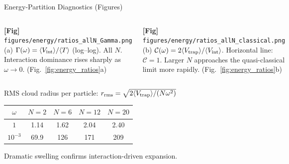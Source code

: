 \documentclass[aspectratio=169,10pt]{beamer}
\newcommand{\figphc}[2]{%
  \colorbox{gray!10}{\parbox{0.44\linewidth}{%
    \centering\smallskip
    \textbf{\color{gray!70}[Fig]}\\[2pt]%
    {\tiny\color{gray!60}\nolinkurl{#1}}\\[2pt]%
    {\scriptsize\color{gray!60}#2}\smallskip}}}
\begin{document}
\begin{frame}{Energy-Partition Diagnostics (Figures)}
  \begin{columns}[T]
      \centering
      \figphc{figures/energy/ratios_allN_Gamma.png}{%
        (a) $\Gamma(\omega)=\langle V_{\rm int}\rangle/\langle T\rangle$
        (log--log). All $N$. Interaction dominance rises sharply as
        $\omega\to 0$. (Fig.~\ref{fig:energy_ratios}a)}
      \centering
      \figphc{figures/energy/ratios_allN_classical.png}{%
        (b) $\mathcal{C}(\omega)=2\langle V_{\rm trap}\rangle/
        \langle V_{\rm int}\rangle$. Horizontal line: $\mathcal{C}=1$.
        Larger $N$ approaches the quasi-classical limit more rapidly.
        (Fig.~\ref{fig:energy_ratios}b)}
  \end{columns}

  \vspace{0.3cm}
  RMS cloud radius per particle:
  $r_{\rm rms}=\sqrt{2\langle V_{\rm trap}\rangle/(N\omega^2)}$

  \begin{center}
    \begin{tabular}{c|cccc}
      \toprule
      $\omega$ & $N=2$ & $N=6$ & $N=12$ & $N=20$ \\
      \midrule
      $1$         &  1.14 &  1.62 &  2.04 &  2.40 \\
      $10^{-3}$   & 69.9  & 126   & 171   & 209   \\
      \bottomrule
    \end{tabular}
  \end{center}
  \small Dramatic swelling confirms interaction-driven expansion.
\end{frame}
\end{document}
